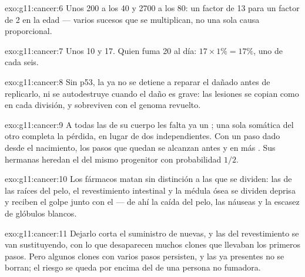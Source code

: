 \begin{solution}{exo:g11:cancer:6}
Unos 200 a los 40 y 2700 a los 80: un factor de 13 para un factor de 2
en la edad --- varios sucesos que se multiplican, no una sola causa
proporcional.
\end{solution}

\begin{solution}{exo:g11:cancer:7}
Unos 10 y 17. Quien fuma 20 al día: $17 \times 1\% = 17\%$, uno de cada
seis.
\end{solution}

\begin{solution}{exo:g11:cancer:8}
Sin p53, la  ya no se detiene a reparar el  dañado antes de
replicarlo, ni se autodestruye cuando el daño es grave: las lesiones se
copian como  en cada división, y sobreviven  con el
genoma revuelto.
\end{solution}

\begin{solution}{exo:g11:cancer:9}
A todas las  de su cuerpo les falta ya un ; una sola
 somática del otro completa la pérdida, en lugar de dos
independientes. Con un paso dado desde el nacimiento, los pasos que
quedan se alcanzan antes y en más . Sus hermanas heredan el
 del mismo progenitor con probabilidad $1/2$.
\end{solution}

\begin{solution}{exo:g11:cancer:10}
Los fármacos matan sin distinción a las  que se dividen: las
 de las raíces del pelo, el revestimiento intestinal y la médula
ósea se dividen deprisa y reciben el golpe junto con el  --- de
ahí la caída del pelo, las náuseas y la escasez de glóbulos blancos.
\end{solution}

\begin{solution}{exo:g11:cancer:11}
Dejarlo corta el suministro de  nuevas, y las  del
revestimiento se van sustituyendo, con lo que desaparecen muchos clones
que llevaban los primeros pasos. Pero algunos clones con varios pasos
persisten, y las  ya presentes no se borran; el riesgo se
queda por encima del de una persona no fumadora.
\end{solution}


